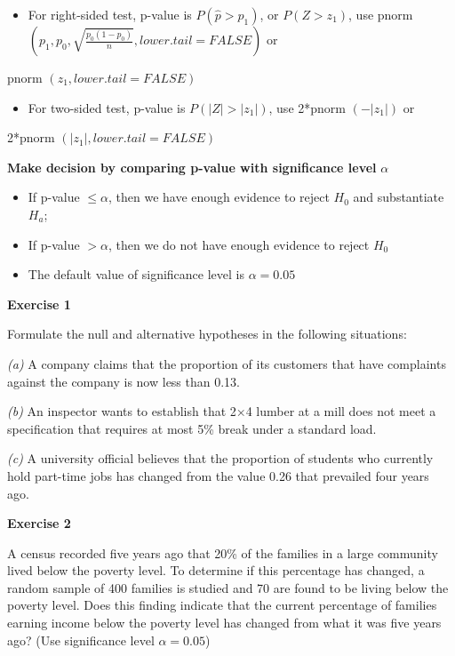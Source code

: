 \documentclass[
]{book}
\providecommand{\tightlist}{%
  \setlength{\itemsep}{0pt}\setlength{\parskip}{0pt}}
\begin{document}
\begin{itemize}
\tightlist
\item
  For right-sided test, p-value is \(P(\hat{p} > p_1)\), or \(P(Z > z_1)\), use pnorm\(({p_1,p_0,}{\sqrt{\frac{p_0(1-p_0)}{n}}}, lower.tail = FALSE)\) or
\end{itemize}

pnorm \((z_1, lower.tail = FALSE)\)

\begin{itemize}
\tightlist
\item
  For two-sided test, p-value is \(P(|Z| > |z_1|)\), use 2*pnorm \((-|z_1|)\) or
\end{itemize}

2*pnorm \((|z_1|, lower.tail = FALSE)\)

\textbf{Make decision by comparing p-value with significance level} \(\alpha\)

\begin{itemize}
\item
  If p-value \(\leq \alpha\), then we have enough evidence to reject \(H_0\) and substantiate \(H_a\);
\item
  If p-value \(> \alpha\), then we do not have enough evidence to reject \(H_0\)
\item
  The default value of significance level is \(\alpha = 0.05\)
\end{itemize}

\textbf{Exercise 1}

Formulate the null and alternative hypotheses in the following situations:

\emph{(a)} A company claims that the proportion of its customers that have complaints against the company is now less than 0.13.

\emph{(b)} An inspector wants to establish that 2×4 lumber at a mill does not meet a specification that requires at most 5\% break under a standard load.

\emph{(c)} A university official believes that the proportion of students who currently hold part-time jobs has changed from the value 0.26 that prevailed four years ago.

\textbf{Exercise 2}

A census recorded five years ago that 20\% of the families in a large community lived below the poverty level. To determine if this percentage has changed, a random sample of 400 families is studied and 70 are found to be living below the poverty level. Does this finding indicate that the current percentage of families earning income below the poverty level has changed from what it was five years ago? (Use significance level \(\alpha=0.05\))
\end{document}

